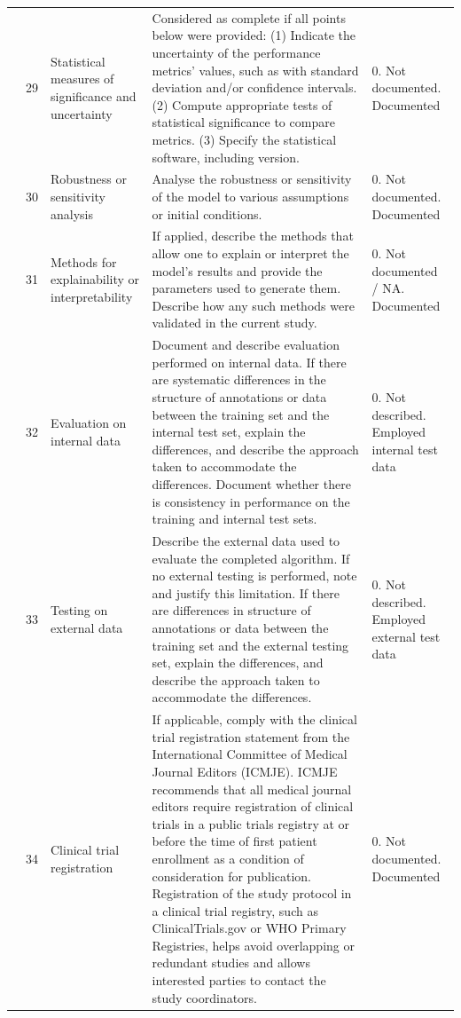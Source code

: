 \begin{landscape}
\begin{longtable}{@{}p{1.7cm}p{0.7cm}p{3.6cm}p{9.6cm}p{3.2cm}@{}}
	\addlinespace
	& 29 & Statistical measures of significance and uncertainty & Considered as complete if all points below were provided: (1) Indicate the uncertainty of the performance metrics' values, such as with standard deviation and/or confidence intervals. (2) Compute appropriate tests of statistical significance to compare metrics. (3) Specify the statistical software, including version. & 0. Not documented\newline 1. Documented \\
	\addlinespace
	& 30 & Robustness or sensitivity analysis & Analyse the robustness or sensitivity of the model to various assumptions or initial conditions. & 0. Not documented\newline 1. Documented \\
	\addlinespace
	& 31 & Methods for explainability or interpretability & If applied, describe the methods that allow one to explain or interpret the model's results and provide the parameters used to generate them. Describe how any such methods were validated in the current study. & 0. Not documented / NA\newline 1. Documented \\
	\addlinespace
	& 32 & Evaluation on internal data & Document and describe evaluation performed on internal data. If there are systematic differences in the structure of annotations or data between the training set and the internal test set, explain the differences, and describe the approach taken to accommodate the differences. Document whether there is consistency in performance on the training and internal test sets. & 0. Not described\newline 1. Employed internal test data \\
	\addlinespace
	& 33 & Testing on external data & Describe the external data used to evaluate the completed algorithm. If no external testing is performed, note and justify this limitation. If there are differences in structure of annotations or data between the training set and the external testing set, explain the differences, and describe the approach taken to accommodate the differences. & 0. Not described\newline 1. Employed external test data \\
	\addlinespace
	& 34 & Clinical trial registration & If applicable, comply with the clinical trial registration statement from the International Committee of Medical Journal Editors (ICMJE). ICMJE recommends that all medical journal editors require registration of clinical trials in a public trials registry at or before the time of first patient enrollment as a condition of consideration for publication. Registration of the study protocol in a clinical trial registry, such as ClinicalTrials.gov or WHO Primary Registries, helps avoid overlapping or redundant studies and allows interested parties to contact the study coordinators. & 0. Not documented\newline 1. Documented \\

\end{longtable}
\end{landscape}
